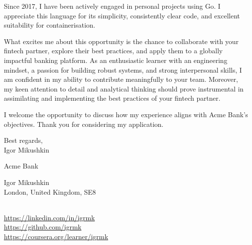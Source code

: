 \begin{paracol}{2}
Since 2017, I have been actively engaged in personal projects using Go.
I appreciate this language for its simplicity, consistently clear code,
and excellent suitability for containerisation.

What excites me about this opportunity is the chance
to collaborate with your fintech partner, explore their best practices,
and apply them to a globally impactful banking platform.
As an enthusiastic learner with an engineering mindset,
a passion for building robust systems, and strong interpersonal skills,
I am confident in my ability to contribute meaningfully to your team.
Moreover, my keen attention to detail and analytical thinking should prove instrumental
in assimilating and implementing the best practices of your fintech partner.

I welcome the opportunity to discuss how my experience
aligns with Acme Bank's objectives.
Thank you for considering my application.

\vspace{12pt}

Best regards,\\
Igor Mikushkin

\newpage
\switchcolumn
\raggedright
\setlength{\parskip}{0em}

    Acme Bank

    Igor Mikushkin\\
    London, United Kingdom, SE8\\
    \myphone\\
    \myemail

    \vspace{6pt}
    {
        \small
        \href{https://linkedin.com/in/igrmk}{https://linkedin.com/in/igrmk}\\
        \href{https://github.com/igrmk}{https://github.com/igrmk}\\
        \href{https://coursera.org/learner/igrmk}{https://coursera.org/learner/igrmk}
        \par
    }

\end{paracol}


